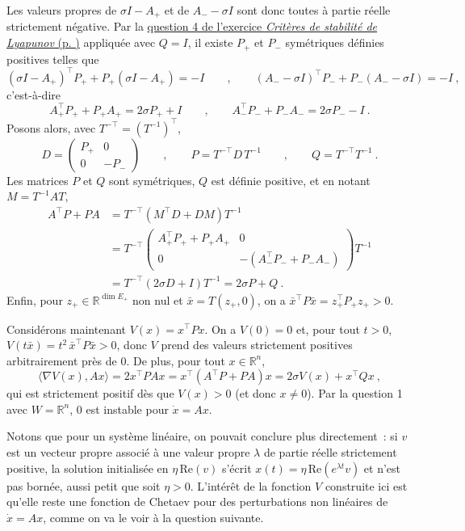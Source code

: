 Les valeurs propres de \(\sigma I-A_+\) et de \(A_- - \sigma I\) sont
donc toutes à partie réelle strictement négative. Par la
\protect\hyperlink{lyap-4}{question 4 de l'exercice \emph{Critères de
stabilité de Lyapunov} (p. \pageref*{lyap-4})} appliquée avec
\(Q=I\), il existe \(P_+\) et \(P_-\) symétriques définies positives
telles que \[
(\sigma I-A_+)^\top P_+ + P_+(\sigma I-A_+) = -I \qquad , \qquad (A_- -\sigma I)^\top P_- + P_-(A_- -\sigma I) = -I \ ,
\] c'est-à-dire \[
A_+^\top P_+ + P_+A_+ = 2\sigma P_+ + I \qquad , \qquad A_-^\top P_- + P_-A_- = 2\sigma P_- - I \ .
\] Posons alors, avec \(T^{-\top}=(T^{-1})^\top\), \[
D = \left( \begin{matrix} P_+ & 0\\ 0 & -P_- \end{matrix}\right) \qquad , \qquad P = T^{-\top} D\, T^{-1} \qquad , \qquad Q = T^{-\top} T^{-1} \ .
\] Les matrices \(P\) et \(Q\) sont symétriques, \(Q\) est définie
positive, et en notant \(M=T^{-1}AT\), \begin{align*}
A^\top P + PA &= T^{-\top}\left( M^\top D + D M\right) T^{-1} \\
&= T^{-\top} \left( \begin{matrix} A_+^\top P_+ + P_+A_+ & 0\\ 0 & -(A_-^\top P_- + P_-A_-) \end{matrix}\right) T^{-1} \\
&= T^{-\top} \left( 2\sigma D + I \right) T^{-1} = 2\sigma P + Q \ .
\end{align*} Enfin, pour \(z_+\in\mathbb{R}^{\dim E_+}\) non nul et
\(\bar{x} = T(z_+,0)\), on a \(\bar{x}^\top P \bar{x} = z_+^\top P_+ z_+>0\).

Considérons maintenant \(V(x)=x^\top P x\). On a \(V(0)=0\) et, pour
tout \(t>0\), \(V(t\bar{x}) = t^2\,\bar{x}^\top P \bar{x}>0\), donc
\(V\) prend des valeurs strictement positives arbitrairement près de
\(0\). De plus, pour tout \(x\in\mathbb{R}^n\), \[
\langle\nabla V (x), Ax\rangle = 2x^\top PAx = x^\top\left(A^\top P + PA\right) x = 2\sigma V(x) + x^\top Q x \ ,
\] qui est strictement positif dès que \(V(x)>0\) (et donc
\(x\neq 0\)). Par la question 1 avec \(W=\mathbb{R}^n\), \(0\) est
instable pour \(\dot{x}=Ax\).

Notons que pour un système linéaire, on pouvait conclure plus
directement~: si \(v\) est un vecteur propre associé à une valeur propre
\(\lambda\) de partie réelle strictement positive, la solution
initialisée en \(\eta\,\mathrm{Re}(v)\) s'écrit
\(x(t)=\eta\,\mathrm{Re}(e^{\lambda t}v)\) et n'est pas bornée, aussi
petit que soit \(\eta>0\). L'intérêt de la fonction \(V\) construite
ici est qu'elle reste une fonction de Chetaev pour des perturbations non
linéaires de \(\dot{x}=Ax\), comme on va le voir à la question suivante.

